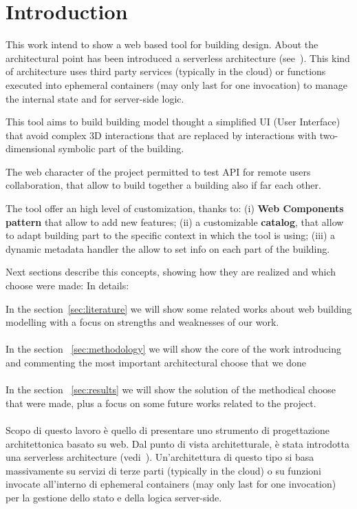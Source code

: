 \section{Introduction}

This work intend to show a web based tool for building design. About the architectural point has been introduced a serverless architecture (see~\cite{Roberts}). This kind of architecture uses third party services (typically in the cloud) or functions executed into ephemeral containers (may only last for one invocation) to manage the internal state and for server-side logic.

This tool aims to build building model thought a simplified UI (User Interface) that avoid complex 3D interactions that are replaced by interactions with two-dimensional symbolic part of the building.

The web character of the project permitted to test API for remote users collaboration, that allow to build together a building also if far each other.

The tool offer an high level of customization, thanks to: (i) \textbf{Web Components pattern} that allow to add new features; (ii) a customizable \textbf{catalog}, that allow to adapt building part to the specific context in which the tool is using; (iii) a dynamic metadata handler the allow to set info on each part of the building.

Next sections describe this concepts, showing how they are realized and which choose were made:
 In details:

In the section~\ref{sec:literature} we will show some related works about web building modelling with a focus on strengths and weaknesses of our work.\\\\
In the section ~\ref{sec:methodology} we will show the core of the work introducing and commenting the most important architectural choose that we done\\\\
In the section ~\ref{sec:results} we will show the solution of the methodical choose that were made, plus a focus on some future works related to the project.\\\\


\iffalse
Scopo di questo lavoro \`e quello di presentare uno strumento di progettazione architettonica basato su web. Dal punto di vista architetturale, \`e stata introdotta una serverless architecture (vedi~\cite{Roberts}). Un'architettura di questo tipo si basa massivamente su servizi di terze parti (typically in the cloud) o su funzioni invocate all'interno di ephemeral containers (may only last for one invocation) per la gestione dello stato e della logica server-side.


